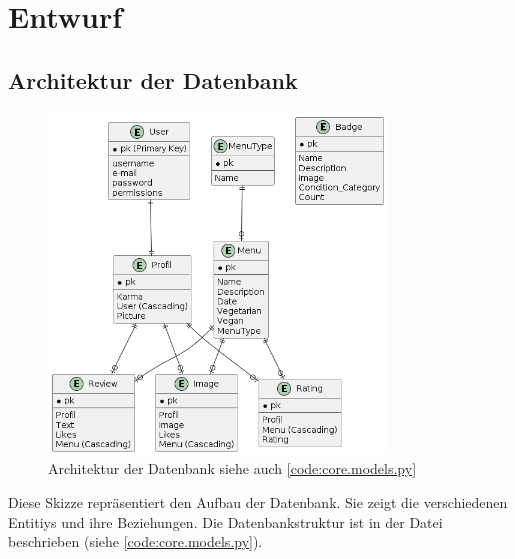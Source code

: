 \chapter{Entwurf} \label{chap:entwurf}

\section{Architektur der Datenbank} \label{sec:DB}
\begin{figure}[ht]
    \centering
    \includegraphics[width=0.8\textwidth]{images/Database.png}
    \caption{Architektur der Datenbank siehe auch \ref{code:core.models.py}}
    \label{fig:DB}
\end{figure}

Diese Skizze repräsentiert den Aufbau der Datenbank. Sie zeigt die verschiedenen
Entitiys und ihre Beziehungen. Die Datenbankstruktur ist in der Datei
 beschrieben (siehe \ref{code:core.models.py}).

